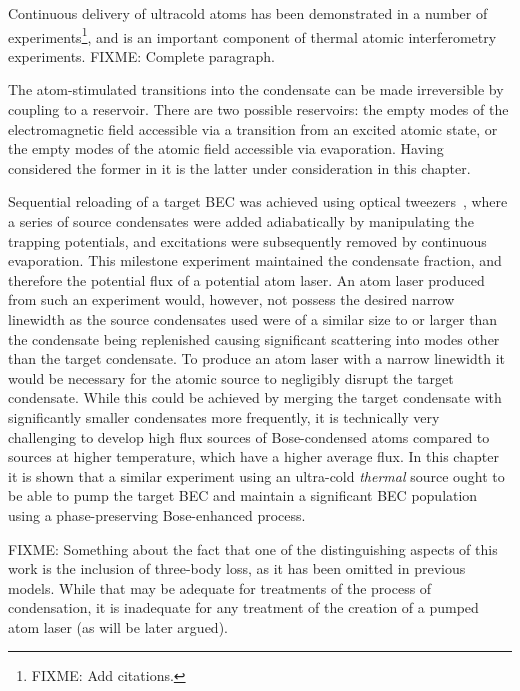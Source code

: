 Continuous delivery of ultracold atoms has been demonstrated in a number of experiments\footnote{FIXME: Add citations.}, and is an important component of thermal atomic interferometry experiments. FIXME: Complete paragraph.

The atom-stimulated transitions into the condensate can be made irreversible by coupling to a reservoir. There are two possible reservoirs: the empty modes of the electromagnetic field accessible via a transition from an excited atomic state, or the empty modes of the atomic field accessible via evaporation. Having considered the former in  it is the latter under consideration in this chapter.

Sequential reloading of a target BEC was achieved using optical tweezers~\citep{Chikkatur:2002qa}, where a series of source condensates were added adiabatically by manipulating the trapping potentials, and excitations were subsequently removed by continuous evaporation. This milestone experiment maintained the condensate fraction, and therefore the potential flux of a potential atom laser. An atom laser produced from such an experiment would, however, not possess the desired narrow linewidth as the source condensates used were of a similar size to or larger than the condensate being replenished causing significant scattering into modes other than the target condensate. To produce an atom laser with a narrow linewidth it would be necessary for the atomic source to negligibly disrupt the target condensate. While this could be achieved by merging the target condensate with significantly smaller condensates more frequently, it is technically very challenging to develop high flux sources of Bose-condensed atoms compared to sources at higher temperature, which have a higher average flux. In this chapter it is shown that a similar experiment using an ultra-cold \emph{thermal} source ought to be able to pump the target BEC and maintain a significant BEC population using a phase-preserving Bose-enhanced process.


FIXME: Something about the fact that one of the distinguishing aspects of this work is the inclusion of three-body loss, as it has been omitted in previous models. While that may be adequate for treatments of the process of condensation, it is inadequate for any treatment of the creation of a pumped atom laser (as will be later argued).


